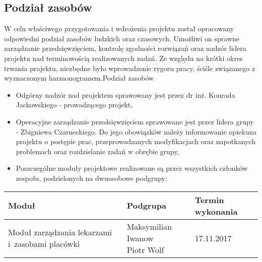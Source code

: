 \subsection{Podział zasobów}

W celu właściwego przygotowania i wdrożenia projektu został opracowany odpowiedni podział zasobów ludzkich oraz czasowych. Umożliwi on sprawne zarządzanie przedsięwzięciem, kontrolę zgodności rozwiązań oraz nadzór lidera projektu nad terminowością realizowanych zadań. Ze względu na krótki okres trwania projektu, niezbędne było wprowadzenie rygoru pracy, ściśle związanego z wyznaczonym harmonogramem.Podział zasobów

\begin{itemize}
	\item Odgórny nadzór nad projektem sprawowany jest przez dr inż. Konrada Jackowskiego - prowadzącego projekt,
	\item Operacyjne zarządzanie przedsięwzięciem sprawowane jest przez lidera grupy - Zbigniewa Czarneckiego. Do jego obowiązków należy informowanie opiekuna projektu o postępie prac, przeprowadzanych modyfikacjach oraz napotkanych problemach oraz rozdzielanie zadań w obrębie grupy,
	\item Poszczególne moduły projektowe realizowane są przez wszystkich członków zespołu, podzielonych na dwuosobowe podgrupy: 
\end{itemize}

\begin{tabularx}{\textwidth}{|p{7cm}|p{4cm}|p{3.67cm}|}
	\hline
	Moduł & Podgrupa & Termin wykonania \tabularnewline \hline
	Moduł zarządzania lekarzami i~zasobami placówki & \shortstack{Maksymilian Iwanow \\ Piotr Wolf} & 17.11.2017 \tabularnewline \hline
\end{tabularx}
